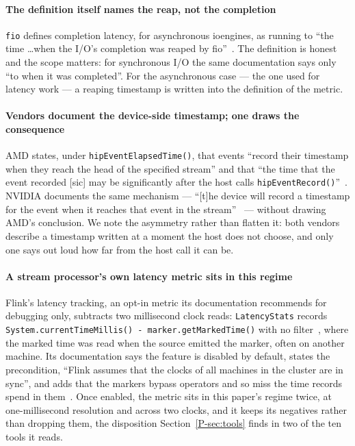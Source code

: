 \documentclass[10pt,journal,onecolumn]{IEEEtran}
\newcommand{\mainTools}{\ref{P-sec:tools}}                %
\begin{document}
\paragraph{The definition itself names the reap, not the completion}
\texttt{fio} defines completion latency, for asynchronous ioengines, as running to ``the time
\ldots when the I/O's completion was reaped by fio''~\cite{fio_howto}. The definition is
honest and the scope matters: for synchronous I/O the same documentation says only ``to when
it was completed''. For the asynchronous case --- the one used for latency work --- a reaping
timestamp is written into the definition of the metric.

\paragraph{Vendors document the device-side timestamp; one draws the consequence}
AMD states, under \texttt{hipEvent\allowbreak{}Elapsed\allowbreak{}Time()}, that events
``record their timestamp when they reach the head of the specified stream'' and that ``the
time that the event recorded [sic] may be significantly after the host calls
\texttt{hipEvent\allowbreak{}Record()}''~\cite{hip_events}. NVIDIA
documents the same mechanism --- ``[t]he device will record a timestamp for the event when it
reaches that event in the stream''~\cite[Sec.~9.1.2]{cuda_bpg} --- without drawing AMD's conclusion. We
note the asymmetry rather than flatten it: both vendors describe a timestamp written at a moment
the host does not choose, and only one says out loud how far from the host call it can be.

\paragraph{A stream processor's own latency metric sits in this regime}
Flink's latency tracking, an opt-in metric its documentation recommends for debugging only,
subtracts two millisecond clock reads: \texttt{LatencyStats} records
\texttt{System.currentTimeMillis() - marker.getMarkedTime()} with no filter~\cite{flink_latencystats},
where the marked time was read when the source emitted the marker, often on another machine.
Its documentation says the feature is disabled by default, states the precondition, ``Flink
assumes that the clocks of all machines in the cluster are in sync'', and adds that the markers
bypass operators and so miss the time records spend in them~\cite{flink_metrics_docs}. Once
enabled, the metric sits in this paper's regime twice, at one-millisecond resolution and across
two clocks, and it keeps its negatives rather than dropping them, the disposition
Section~\mainTools{} finds in two of the ten tools it reads.
\end{document}
